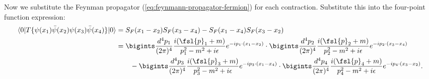 Now we substitute the Feynman propagator (\ref{eq:feynmann-propagator-fermion}) for each contraction. Substitute this into the four-point function expression:
\begin{align}
    \langle 0 | T \{ \psi(x_1) \bar{\psi}(x_2) \psi(x_3) \bar{\psi}(x_4) \} | 0 \rangle
    &= S_F(x_1 - x_2) S_F(x_3 - x_4) - S_F(x_1 - x_4) S_F(x_3 - x_2)\notag\\
    &= \bigints \frac{d^4 p_1}{(2\pi)^4} \frac{i (\fsl{p}_1 + m)}{p_1^2 - m^2 + i\epsilon} e^{-ip_1 \cdot (x_1 - x_2)}\cdot\bigints \frac{d^4 p_2}{(2\pi)^4} \frac{i (\fsl{p}_2 + m)}{p_2^2 - m^2 + i\epsilon} e^{-ip_2 \cdot (x_3 - x_4)}\notag\\
    &\hspace{20pt}-\bigints \frac{d^4 p_3}{(2\pi)^4} \frac{i (\fsl{p}_3 + m)}{p_3^2 - m^2 + i\epsilon} e^{-ip_3 \cdot (x_1 - x_4)}\cdot\bigints \frac{d^4 p_4}{(2\pi)^4} \frac{i (\fsl{p}_4 + m)}{p_4^2 - m^2 + i\epsilon} e^{-ip_4 \cdot (x_3 - x_2)}.
\end{align}
\bigskip\bigskip\hline\hline\bigskip